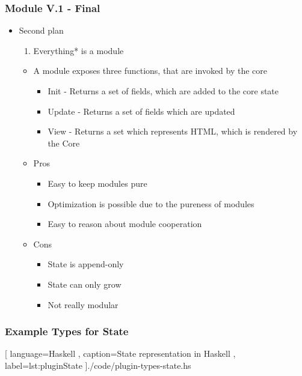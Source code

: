 \begin{frame}
  \frametitle{Module V.1 - Final}
  \begin{itemize}
    \item Second plan
      \pause
      \begin{enumerate}
        \item Everything* is a module
      \end{enumerate}
      \pause
      \begin{itemize}
        \item A module exposes three functions, that are invoked by the core
          \pause
          \begin{itemize}
            \item Init - Returns a set of fields, which are added to the core state
              \pause
            \item Update - Returns a set of fields which are updated
              \pause
            \item View - Returns a set which represents HTML, which is rendered by
              the Core
          \end{itemize}
          \pause
        \item Pros
          \pause
          \begin{itemize}
            \item Easy to keep modules pure
              \pause
            \item Optimization is possible due to the pureness of modules
              \pause
            \item Easy to reason about module cooperation
          \end{itemize}
          \pause
        \item Cons
          \pause
          \begin{itemize}
            \item State is append-only
              \pause
            \item State can only grow
              \pause
            \item Not really modular
          \end{itemize}
      \end{itemize}
  \end{itemize}
\end{frame}

\begin{frame}
  \frametitle{Example Types for State}
    \begin{center}
      
      [ language=Haskell
      , caption={State representation in Haskell}
      , label=lst:pluginState
      ]{./code/plugin-types-state.hs}
    \end{center}
\end{frame}

